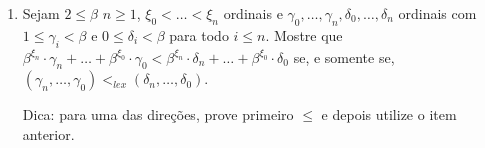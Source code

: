 \begin{exercise}
\begin{enumerate}[label=(\alph*)]
        Para a unicidade, utilize indução em $\alpha$.
        
        \item Sejam $2\leq \beta$ $n\geq 1$, $\xi_0<\dots<\xi_n$ ordinais e $\gamma_0,\dots,\gamma_n, \delta_0, \dots, \delta_n$ ordinais com $1\leq \gamma_i<\beta$ e $0\leq \delta_i<\beta$ para todo $i\leq n$.
        Mostre que $\beta^{\xi_n}\cdot \gamma_n+\dots+\beta^{\xi_0}\cdot \gamma_0<\beta^{\xi_n}\cdot \delta_n+\dots+\beta^{\xi_0}\cdot \delta_0$ se, e somente se, $(\gamma_n, \dots, \gamma_0)<_{lex}(\delta_n, \dots, \delta_0)$.

        Dica: para uma das direções, prove primeiro $\leq$ e depois utilize o item anterior.
    \end{enumerate}
\end{exercise}
